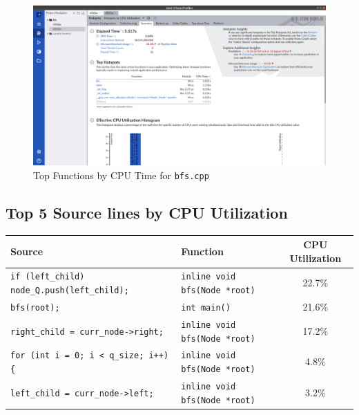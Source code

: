 \documentclass[11pt, swedish, openany]{book}
\begin{document}
\begin{figure}[H]
    \centering
    \includegraphics[scale=0.25]{vtune/bfs/hs.png}
    \caption{Top Functions by CPU Time for \texttt{bfs.cpp}}
\end{figure}

\newpage
\subsection*{Top 5 Source lines by CPU Utilization}
\begin{table}[H]
    \begin{tabular}{||l|l||c||}
        \hline
        Source                                               & Function                             & CPU Utilization \\
        \hline
        \texttt{if (left\_child) node\_Q.push(left\_child);} & \texttt{inline void bfs(Node *root)} & 22.7\%          \\
        \texttt{bfs(root);}                                  & \texttt{int main()}                  & 21.6\%          \\
        \texttt{right\_child = curr\_node->right;}           & \texttt{inline void bfs(Node *root)} & 17.2\%          \\
        \texttt{for (int i = 0; i < q\_size; i++) \{}        & \texttt{inline void bfs(Node *root)} & 4.8\%           \\
        \texttt{left\_child = curr\_node->left;}             & \texttt{inline void bfs(Node *root)} & 3.2\%           \\
        \hline
    \end{tabular}
\end{table}
\end{document}
